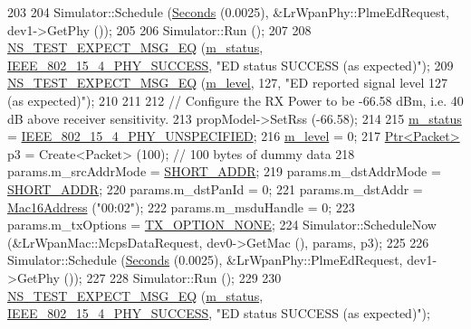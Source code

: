 \begin{DoxyCode}
203 
204   Simulator::Schedule (\hyperlink{group__timecivil_ga33c34b816f8ff6628e33d5c8e9713b9e}{Seconds} (0.0025), &LrWpanPhy::PlmeEdRequest, dev1->GetPhy ());
205 
206   Simulator::Run ();
207 
208   \hyperlink{group__testing_ga7304ba46a28d8cf08dfdfd6499cf7068}{NS\_TEST\_EXPECT\_MSG\_EQ} (\hyperlink{classLrWpanEdTestCase_a412f77be5f81e80661cf8e5563e62851}{m\_status}, 
      \hyperlink{group__lr-wpan_gga6494269d13d45c511a07b7ccbb1de754a2a81d56261f039e08cf2dd91de10b618}{IEEE\_802\_15\_4\_PHY\_SUCCESS}, \textcolor{stringliteral}{"ED status SUCCESS (as expected)"});
209   \hyperlink{group__testing_ga7304ba46a28d8cf08dfdfd6499cf7068}{NS\_TEST\_EXPECT\_MSG\_EQ} (\hyperlink{classLrWpanEdTestCase_a7ecaee7923b4d55cc4a8545bc0332469}{m\_level}, 127, \textcolor{stringliteral}{"ED reported signal level 127 (as
       expected)"});
210 
211 
212   \textcolor{comment}{// Configure the RX Power to be -66.58 dBm, i.e. 40 dB above receiver sensitivity.}
213   propModel->SetRss (-66.58);
214 
215   \hyperlink{classLrWpanEdTestCase_a412f77be5f81e80661cf8e5563e62851}{m\_status} = \hyperlink{group__lr-wpan_gga6494269d13d45c511a07b7ccbb1de754a33aedad985a3e4dd7a0c6790a2c677a0}{IEEE\_802\_15\_4\_PHY\_UNSPECIFIED};
216   \hyperlink{classLrWpanEdTestCase_a7ecaee7923b4d55cc4a8545bc0332469}{m\_level} = 0;
217   \hyperlink{classns3_1_1Ptr}{Ptr<Packet>} p3 = Create<Packet> (100);  \textcolor{comment}{// 100 bytes of dummy data}
218   params.m\_srcAddrMode = \hyperlink{group__lr-wpan_gga9ea4702ab11d5329e1593afebce06bbba7bf58267dde39bdabfeeb5793450c5e3}{SHORT\_ADDR};
219   params.m\_dstAddrMode = \hyperlink{group__lr-wpan_gga9ea4702ab11d5329e1593afebce06bbba7bf58267dde39bdabfeeb5793450c5e3}{SHORT\_ADDR};
220   params.m\_dstPanId = 0;
221   params.m\_dstAddr = \hyperlink{classns3_1_1Mac16Address}{Mac16Address} (\textcolor{stringliteral}{"00:02"});
222   params.m\_msduHandle = 0;
223   params.m\_txOptions = \hyperlink{group__lr-wpan_gga74ea891230ebf45d80d69a67266930a4a873c8b896435efcdd1c058668efb88ea}{TX\_OPTION\_NONE};
224   Simulator::ScheduleNow (&LrWpanMac::McpsDataRequest, dev0->GetMac (), params, p3);
225 
226   Simulator::Schedule (\hyperlink{group__timecivil_ga33c34b816f8ff6628e33d5c8e9713b9e}{Seconds} (0.0025), &LrWpanPhy::PlmeEdRequest, dev1->GetPhy ());
227 
228   Simulator::Run ();
229 
230   \hyperlink{group__testing_ga7304ba46a28d8cf08dfdfd6499cf7068}{NS\_TEST\_EXPECT\_MSG\_EQ} (\hyperlink{classLrWpanEdTestCase_a412f77be5f81e80661cf8e5563e62851}{m\_status}, 
      \hyperlink{group__lr-wpan_gga6494269d13d45c511a07b7ccbb1de754a2a81d56261f039e08cf2dd91de10b618}{IEEE\_802\_15\_4\_PHY\_SUCCESS}, \textcolor{stringliteral}{"ED status SUCCESS (as expected)"});

\end{DoxyCode}
